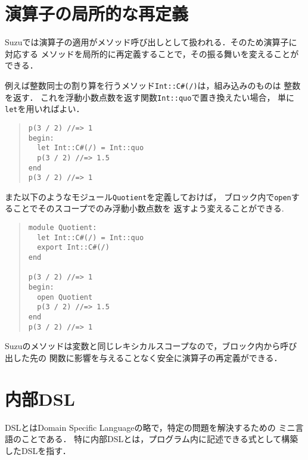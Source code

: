 \documentclass[a4paper,11pt,dvipdfmx]{jreport}
\begin{document}
\section{演算子の局所的な再定義}
\label{section:operator}

Suzuでは演算子の適用がメソッド呼び出しとして扱われる．そのため演算子に対応する
メソッドを局所的に再定義することで，その振る舞いを変えることができる．

例えば整数同士の割り算を行うメソッド\verb|Int::C#(/)|は，組み込みのものは
整数を返す．
これを浮動小数点数を返す関数\verb|Int::quo|で置き換えたい場合，
単に\verb|let|を用いればよい．
\begin{quote}
\begin{verbatim}
p(3 / 2) //=> 1
begin:
  let Int::C#(/) = Int::quo
  p(3 / 2) //=> 1.5
end
p(3 / 2) //=> 1
\end{verbatim}
\end{quote}

また以下のようなモジュール\verb|Quotient|を定義しておけば，
ブロック内で\verb|open|することでそのスコープでのみ浮動小数点数を
返すよう変えることができる.
\begin{quote}
\begin{verbatim}
module Quotient:
  let Int::C#(/) = Int::quo
  export Int::C#(/)
end

p(3 / 2) //=> 1
begin:
  open Quotient
  p(3 / 2) //=> 1.5
end
p(3 / 2) //=> 1
\end{verbatim}
\end{quote}

Suzuのメソッドは変数と同じレキシカルスコープなので，ブロック内から呼び出した先の
関数に影響を与えることなく安全に演算子の再定義ができる．


\section{内部DSL}
\label{section:dsl}

DSLとはDomain Specific Languageの略で，特定の問題を解決するための
ミニ言語のことである．
特に内部DSLとは，プログラム内に記述できる式として構築したDSLを指す．
\end{document}
